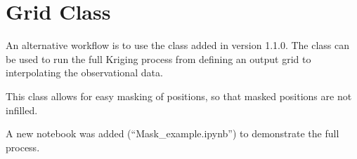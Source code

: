 \documentclass[letterpaper,10pt,english]{sphinxmanual}
\begin{document}
\sphinxstepscope


\chapter{Grid Class}
\label{\detokenize{grid:grid-class}}\label{\detokenize{grid::doc}}
\sphinxAtStartPar
An alternative workflow is to use the  class added in version 1.1.0. The  class can be
used to run the full Kriging process from defining an output grid to interpolating the observational
data.

\sphinxAtStartPar
This class allows for easy masking of positions, so that masked positions are not infilled.

\sphinxAtStartPar
A new notebook was added (“Mask\_example.ipynb”) to demonstrate the full process.
\end{document}
